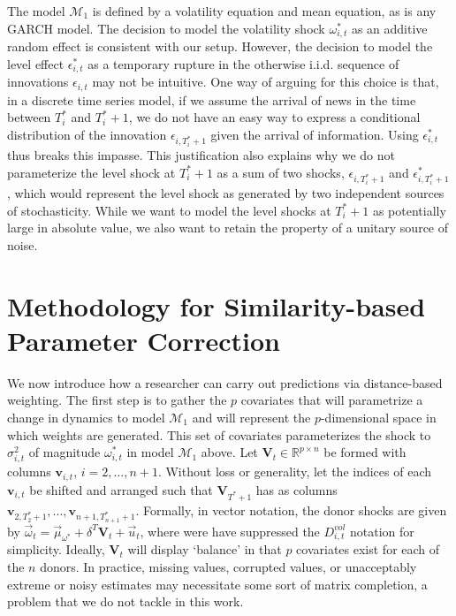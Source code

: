\documentclass{uiucthesis2021}
\newcommand{\x}{\textbf{v}}
\def\mc#1{\mathcal{#1}} %
\def\mc#1{\mathcal{#1}}
\theoremstyle{definition}
\begin{document}
The model $\mc{M}_1$ is defined by a volatility equation and mean equation, as is any GARCH model.  The decision to model the volatility shock $\omega^{*}_{i,t}$ as an additive random effect is consistent with our setup.  However, the decision to model the level effect $\epsilon^{*}_{i,t}$ as a temporary rupture in the otherwise i.i.d. sequence of innovations $\epsilon_{i,t}$ may not be intuitive.  One way of arguing for this choice is that, in a discrete time series model, if we assume the arrival of news in the time between $T_{i}^{*}$ and $T_{i}^{*}+1$, we do not have an easy way to express a conditional distribution of the innovation $\epsilon_{i,T_{i}^{*}+1}$ given the arrival of information.  Using $\epsilon^{*}_{i,t}$ thus breaks this impasse.  This justification also explains why we do not parameterize the level shock at $T_{i}^{*}+1$ as a sum of two shocks, $\epsilon_{i,T_{i}^{*}+1}$ and $\epsilon^{*}_{i,T_{i}^{*}+1}$, which would represent the level shock as generated by two independent sources of stochasticity. While we want to model the level shocks at $T_{i}^{*}+1$ as potentially large in absolute value, we also want to retain the property of a unitary source of noise.

\section{Methodology for Similarity-based Parameter Correction}

We now introduce how a researcher can carry out predictions via distance-based weighting.  The first step is to gather the $p$ covariates that will parametrize a change in dynamics to model $\mc{M}_1$ and will represent the $p$-dimensional space in which weights are generated.  This set of covariates parameterizes the shock to $\sigma^2_{i,t}$  of magnitude $\omega^*_{i,t}$ in model $\mc{M}_{1}$ above.  Let $\textbf{V}_{t} \in \mathbb{R}^{p \times n}$ be formed with columns $\x_{i,t}$, $i = 2,\ldots,n+1$.  Without loss or generality, let the indices of each $\x_{i,t}$ be shifted and arranged such that $\textbf{V}_{T^{*}+1}$ has as columns $\x_{2,T_{2}^{*}+1},...,\x_{n+1,T_{n+1}^{*}+1}$.  Formally, in vector notation, the donor shocks are given by $\vec{\omega}_t = \vec{\mu}_{\omega^{*}} + \delta^{T}\textbf{V}_{t} + \vec{u}_{t}$, 
    where were have suppressed the $D^{vol}_{i,t}$ notation for simplicity.  %
    Ideally, $\textbf{V}_{t}$ will display `balance' in that $p$ covariates exist for each of the $n$ donors.  In practice, missing values, corrupted values, or unacceptably extreme or noisy estimates may necessitate some sort of matrix completion, a problem that we do not tackle in this work.  
\end{document}
